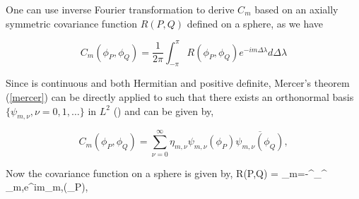 		
		One can use inverse Fourier transformation to derive $C_m$ based on an axially symmetric covariance function $R(P,Q)$ defined on a sphere, as we have
		
	\[ 
	C_m(\phi_P, \phi_Q) = \frac{1}{2\pi}\int_{-\pi}^{\pi} R(\phi_P, \phi_Q)e^{-im\Delta\lambda} d\Delta\lambda \]
	
	Since \Cm is continuous and both Hermitian and positive definite, Mercer's theorem (\ref{mercer}) can be directly applied to \Cm such that there exists an orthonormal basis $\{\psi_{m,\nu}, \nu = 0,1,\ldots \}$ in $L^2$ (\cite{Huang2012}) and \Cm can be given by, 
	
	\[ 
	C_m(\phi_P,\phi_Q) = \sum_{\nu=0}^{\infty} \eta_{m,\nu}\psi_{m,\nu}(\phi_P)\overline{\psi_{m,\nu}(\phi_Q)},  \]
	

Now the covariance function on a sphere is given by,
		\beq \label{RPQ_orthonormal}
			R(P,Q) = \sum_{m=-\infty}^{\infty}\sum_{}^{\infty} \eta_{m,\nu}e^{im\Delta\lambda}\psi_{m,\nu}(\phi_P),
		\eeq
		
